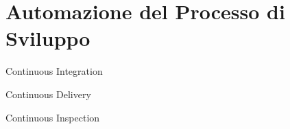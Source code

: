 
\section{Automazione del Processo di Sviluppo}

\begin{frame}{Continuous Integration}
    
\end{frame}

\begin{frame}{Continuous Delivery}
    
\end{frame}

\begin{frame}{Continuous Inspection}
    
\end{frame}